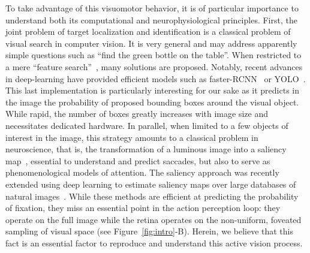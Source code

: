 To take advantage of this visuomotor behavior, it is of particular importance to understand both its computational and neurophysiological principles. First, the joint problem of target localization and identification is a classical problem of visual search in computer vision. It is very general and may address apparently simple questions such as ``find the green bottle on the table''. 
When restricted to a mere ``feature search''~\citep{Treisman80}, many solutions are proposed. Notably, recent advances in deep-learning have provided  efficient models such as faster-RCNN~\citep{Ren17} or YOLO~\citep{Redmon15}. 
\ICANN This last implementation is particularly interesting for our sake as it predicts in the image the probability of proposed bounding boxes around the visual object. While rapid, the number of boxes greatly increases with image size and necessitates dedicated hardware. 
\fi
In parallel, when limited to a few objects of interest in the image, this strategy amounts to a classical problem in neuroscience, that is, the transformation of a luminous image into a saliency map~\citep{Itti01}, essential to understand and predict saccades, but also to serve as phenomenological models of attention. The saliency approach was recently extended using deep learning  to estimate saliency maps over large databases of natural images~\citep{Kummerer16}. While these methods are efficient at predicting the probability of fixation, they miss an essential point in the action perception loop: they operate on the full image while the retina operates on the non-uniform, foveated sampling of visual space (see Figure~\ref{fig:intro}-B). 
\ICANN
Herein, we believe that this fact is an essential factor to reproduce and understand this active vision process.
\fi

